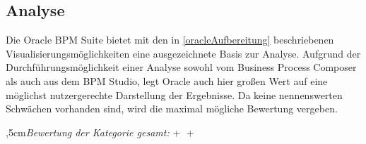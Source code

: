 
\subsection{Analyse}

Die Oracle BPM Suite bietet mit den in \ref{oracleAufbereitung} beschriebenen Visualisierungsmöglichkeiten eine ausgezeichnete Basis zur Analyse. Aufgrund der Durchführungsmöglichkeit einer Analyse sowohl vom Business Process Composer als auch aus dem BPM Studio, legt Oracle auch hier großen Wert auf eine möglichst nutzergerechte Darstellung der Ergebnisse. Da keine nennenswerten Schwächen vorhanden sind, wird die maximal mögliche Bewertung vergeben.

\bigskip{},5cm\textit{Bewertung der Kategorie gesamt:} \hspace{5mm} \textcircled{+} \textcircled{+}
\leftskip=0cm

